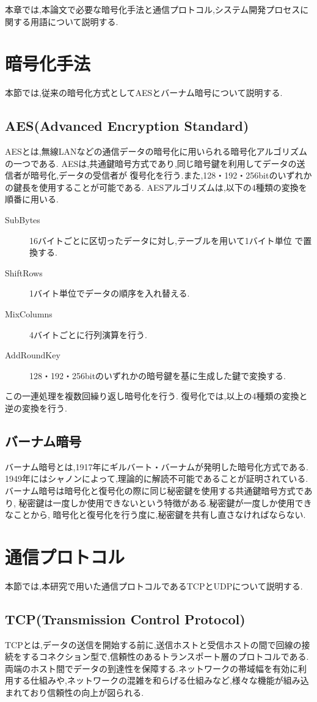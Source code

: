 
本章では,本論文で必要な暗号化手法と通信プロトコル,システム開発プロセスに関する用語について説明する.
\section{暗号化手法}
本節では,従来の暗号化方式としてAESとバーナム暗号について説明する.
\subsection{AES(Advanced Encryption Standard)}
AESとは,無線LANなどの通信データの暗号化に用いられる暗号化アルゴリズムの一つである.
AESは,共通鍵暗号方式であり,同じ暗号鍵を利用してデータの送信者が暗号化,データの受信者が
復号化を行う.また,128・192・256bitのいずれかの鍵長を使用することが可能である.
AESアルゴリズムは,以下の4種類の変換を順番に用いる\cite{AES}.
\begin{description}
	\item[SubBytes] 16バイトごとに区切ったデータに対し,テーブルを用いて1バイト単位
で置換する.
	\item[ShiftRows] 1バイト単位でデータの順序を入れ替える.
	\item[MixColumns] 4バイトごとに行列演算を行う.
	\item[AddRoundKey] 128・192・256bitのいずれかの暗号鍵を基に生成した鍵で変換する.
\end{description}
この一連処理を複数回繰り返し暗号化を行う.
復号化では,以上の4種類の変換と逆の変換を行う.
\subsection{バーナム暗号}
バーナム暗号とは,1917年にギルバート・バーナムが発明した暗号化方式である\cite{banamu}.
1949年にはシャノンによって,理論的に解読不可能であることが証明されている.
バーナム暗号は暗号化と復号化の際に同じ秘密鍵を使用する共通鍵暗号方式であり,
秘密鍵は一度しか使用できないという特徴がある.秘密鍵が一度しか使用できなことから,
暗号化と復号化を行う度に,秘密鍵を共有し直さなければならない.

\section{通信プロトコル}
本節では,本研究で用いた通信プロトコルであるTCPとUDPについて説明する.
\subsection{TCP(Transmission Control Protocol)}
TCPとは,データの送信を開始する前に,送信ホストと受信ホストの間で回線の接続をするコネクション型で,信頼性のあるトランスポート層のプロトコルである\cite{tcp/udp}.両端のホスト間でデータの到達性を保障する.ネットワークの帯域幅を有効に利用する仕組みや,ネットワークの混雑を和らげる仕組みなど,様々な機能が組み込まれており信頼性の向上が図られる.
